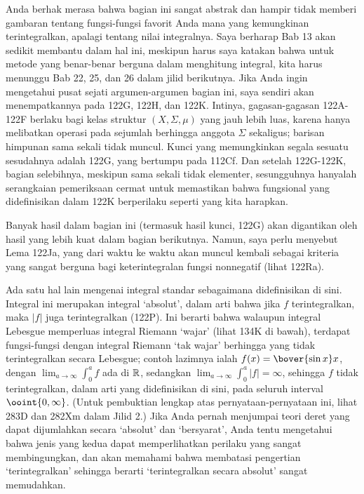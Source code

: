 {Anda berhak merasa bahwa bagian ini sangat abstrak dan hampir tidak
memberi gambaran tentang fungsi-fungsi favorit Anda mana yang kemungkinan
terintegralkan, apalagi tentang nilai integralnya. Saya berharap Bab 13
akan sedikit membantu dalam hal ini, meskipun harus saya katakan bahwa
untuk metode yang benar-benar berguna dalam menghitung integral, kita
harus menunggu Bab 22, 25, dan 26 dalam jilid berikutnya. Jika Anda ingin
mengetahui pusat sejati argumen-argumen bagian ini, saya sendiri akan
menempatkannya pada 122G, 122H, dan 122K. Intinya, gagasan-gagasan
122A-122F berlaku bagi kelas struktur $(X,\Sigma,\mu)$ yang jauh lebih
luas, karena hanya melibatkan operasi pada sejumlah berhingga anggota
$\Sigma$ sekaligus; barisan himpunan sama sekali tidak muncul. Kunci
yang memungkinkan segala sesuatu sesudahnya adalah 122G, yang bertumpu
pada 112Cf. Dan setelah 122G-122K, bagian selebihnya, meskipun sama sekali
tidak elementer, sesungguhnya hanyalah serangkaian pemeriksaan cermat
untuk memastikan bahwa fungsional yang didefinisikan dalam 122K
berperilaku seperti yang kita harapkan.

Banyak hasil dalam bagian ini (termasuk hasil kunci, 122G) akan digantikan
oleh hasil yang lebih kuat dalam bagian berikutnya. Namun, saya perlu
menyebut Lema 122Ja, yang dari waktu ke waktu akan muncul kembali sebagai
kriteria yang sangat berguna bagi keterintegralan fungsi nonnegatif
(lihat 122Ra).

Ada satu hal lain mengenai integral standar sebagaimana didefinisikan di
sini. Integral ini merupakan integral `absolut', dalam arti bahwa jika
$f$ terintegralkan, maka $|f|$ juga terintegralkan (122P). Ini berarti
bahwa walaupun integral Lebesgue memperluas integral Riemann `wajar'
(lihat 134K di bawah), terdapat fungsi-fungsi dengan integral Riemann
`tak wajar' berhingga yang tidak terintegralkan secara Lebesgue; contoh lazimnya
ialah $f(x)=\bover{\sin x}x$, dengan
$\lim_{a\to\infty}\int_0^af$ ada di $\Bbb R$, sedangkan
$\lim_{a\to\infty}\int_0^a|f|=\infty$, sehingga $f$ tidak terintegralkan,
dalam arti yang didefinisikan di sini, pada seluruh interval
$\ooint{0,\infty}$. (Untuk pembuktian lengkap atas pernyataan-pernyataan
ini, lihat 283D dan 282Xm dalam Jilid 2.) Jika Anda pernah menjumpai teori
deret yang dapat dijumlahkan secara `absolut' dan `bersyarat', Anda tentu
mengetahui bahwa jenis yang kedua dapat memperlihatkan perilaku yang
sangat membingungkan, dan akan memahami bahwa membatasi pengertian
`terintegralkan' sehingga berarti `terintegralkan secara absolut' sangat
memudahkan.

}
